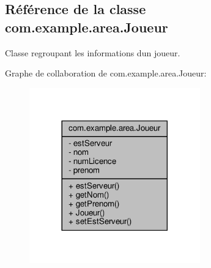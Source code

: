 \hypertarget{classcom_1_1example_1_1area_1_1_joueur}{}\subsection{Référence de la classe com.\+example.\+area.\+Joueur}
\label{classcom_1_1example_1_1area_1_1_joueur}


Classe regroupant les informations d\textquotesingle{}un joueur.  




Graphe de collaboration de com.\+example.\+area.\+Joueur\+:
\nopagebreak
\begin{figure}[H]
\begin{center}
\leavevmode
\includegraphics[width=209pt]{classcom_1_1example_1_1area_1_1_joueur__coll__graph}
\end{center}
\end{figure}
